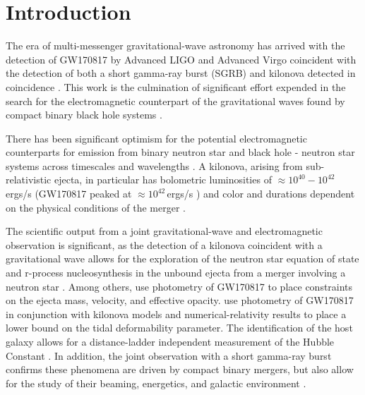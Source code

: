 \documentclass[twocolumn]{aastex62}
\begin{document}

\section{Introduction}
\label{sec:Intro}

The era of multi-messenger gravitational-wave astronomy has arrived with the detection of GW170817 \citep{AbEA2017b} by Advanced LIGO \citep{aLIGO} and Advanced Virgo \citep{adVirgo} coincident with the detection of both a short gamma-ray burst (SGRB) \citep{AbEA2017c,AbEA2017d,AbEA2017e} and kilonova detected in coincidence \citep{CoFo2017,SmCh2017,AbEA2017f,AbEA2017g}. 
This work is the culmination of significant effort expended in the search for the electromagnetic counterpart of the gravitational waves found by compact binary black hole systems \citep{AbEA2016a,AbEA2016g,AbEA2017}.

There has been significant optimism for the potential electromagnetic counterparts for emission from binary neutron star and black hole - neutron star systems across timescales and wavelengths \citep{Nakar2007,MeBe2012}. 
A  kilonova, arising from sub-relativistic ejecta, in particular has bolometric luminosities of $\approx 10^{40}-10^{42}$\,ergs/s \citep{MeBa2015,BaKa2013} (GW170817 peaked at $\approx 10^{42}$\,ergs/s \citep{SmCh2017})
and color and durations dependent on the physical conditions of the merger \citep{MeMa2010,KaBa2013,BaKa2013,TaHo2013,KaFe2015,BaKa2016,Me2017}.

The scientific output from a joint gravitational-wave and electromagnetic observation is significant, as the detection of a kilonova coincident with a gravitational wave allows for the exploration of the neutron star equation of state \citep{BaBa2013} and r-process nucleosynthesis in the unbound ejecta from a merger involving a neutron star \citep{MeBa2015,JuBa2015,RoLi2017,WuFe2016}.
Among others, \cite{SmCh2017} use photometry of GW170817 to place constraints on the ejecta mass, velocity, and effective opacity.
\cite{RaPe2018} use photometry of GW170817 in conjunction with kilonova models and numerical-relativity results to place a lower bound on the tidal deformability parameter. 
The identification of the host galaxy allows for a distance-ladder independent measurement of the Hubble Constant \citep{AbEA2017h}.
In addition, the joint observation with a short gamma-ray burst confirms these phenomena are driven by compact binary mergers, but also allow for the study of their beaming, energetics, and galactic environment \citep{MeBe2012}.
\end{document}
